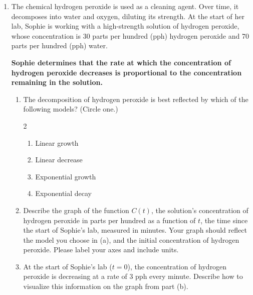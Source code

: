 \documentclass{article}
\begin{document}
\begin{enumerate}
     \item The chemical hydrogen peroxide is used as a cleaning agent. Over time, it decomposes into water and oxygen, diluting its strength. At the start of her lab, Sophie is working with a high-strength solution of hydrogen peroxide, whose concentration is  30 parts per hundred (pph) hydrogen peroxide and 70 parts per hundred (pph) water. 
    
   {\bf  Sophie determines that the rate at which the concentration of hydrogen peroxide decreases is proportional to the concentration remaining in the solution.} 
    
    \begin{enumerate}
        \item The decomposition of hydrogen peroxide is best reflected by which of the following models? (Circle one.) 
\begin{multicols}{2}
        \begin{enumerate}
    
            \item Linear growth
            \item Linear decrease
            \item Exponential growth
            \item Exponential decay
        \end{enumerate}
        \end{multicols}
    \item Describe the graph of the function $C(t)$, the solution's concentration of hydrogen peroxide in parts per hundred as a function of $t$, the time since the start of Sophie's lab, measured in minutes. Your graph should reflect the model you choose in (a), and the initial concentration of hydrogen peroxide. Please label your axes and include units.\\
    


    \item At the start of Sophie's lab ($t=0$), the concentration of hydrogen peroxide is decreasing at a rate of 3 pph every minute. Describe how to visualize this information on the graph from part (b).
  
        
    

\end{enumerate}
\end{enumerate}
\end{document}

